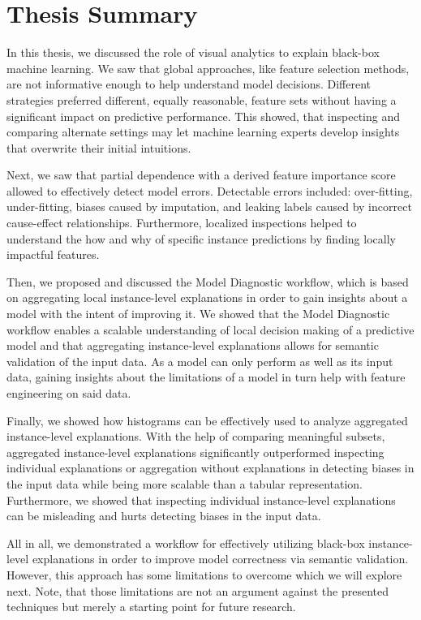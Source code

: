 \chapter{Thesis Summary}
\label{chap:summary}

In this thesis, we discussed the role of visual analytics to explain black-box machine learning.
We saw that global approaches, like feature selection methods, are not informative enough to help understand model decisions.
Different strategies preferred different, equally reasonable, feature sets without having a significant impact on predictive performance.
This showed, that inspecting and comparing alternate settings may let machine learning experts develop insights that overwrite their initial intuitions.

Next, we saw that partial dependence with a derived feature importance score allowed to effectively detect model errors.
Detectable errors included: over-fitting, under-fitting, biases caused by imputation, and leaking labels caused by incorrect cause-effect relationships.
Furthermore, localized inspections helped to understand the how and why of specific instance predictions by finding locally impactful features.

Then, we proposed and discussed the Model Diagnostic workflow, which is based on aggregating local instance-level explanations in order to gain insights about a model with the intent of improving it.
We showed that the Model Diagnostic workflow enables a scalable understanding of local decision making of a predictive model and that aggregating instance-level explanations allows for semantic validation of the input data.
As a model can only perform as well as its input data, gaining insights about the limitations of a model in turn help with feature engineering on said data.

Finally, we showed how histograms can be effectively used to analyze aggregated instance-level explanations.
With the help of comparing meaningful subsets, aggregated instance-level explanations significantly outperformed inspecting individual explanations or aggregation without explanations in detecting biases in the input data while being more scalable than a tabular representation.
Furthermore, we showed that inspecting individual instance-level explanations can be misleading and hurts detecting biases in the input data.

All in all, we demonstrated a workflow for effectively utilizing black-box instance-level explanations in order to improve model correctness via semantic validation.
However, this approach has some limitations to overcome which we will explore next.
Note, that those limitations are not an argument against the presented techniques but merely a starting point for future research.

